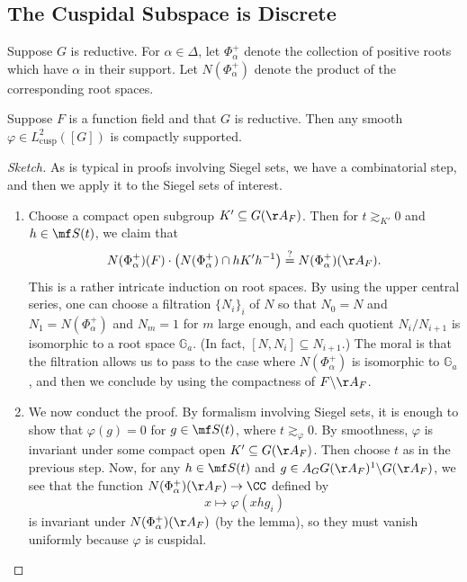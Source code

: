 \documentclass{article}
\begin{document}
\subsection{The Cuspidal Subspace is Discrete}
\begin{notation}
	Suppose $G$ is reductive. For $\alpha\in\Delta$, let $\Phi_\alpha^+$ denote the collection of positive roots which have $\alpha$ in their support. Let $N(\Phi_\alpha^+)$ denote the product of the corresponding root spaces.
\end{notation}
\begin{theorem}[Harder]
	Suppose $F$ is a function field and that $G$ is reductive. Then any smooth $\varphi\in L^2_{\mathrm{cusp}}([G])$ is compactly supported.
\end{theorem}
\begin{proof}[Sketch]
	As is typical in proofs involving Siegel sets, we have a combinatorial step, and then we apply it to the Siegel sets of interest.
	\begin{enumerate}
		\item Choose a compact open subgroup $K'\subseteq G(\AA_F)$. Then for $t\gtrsim_{K'}0$ and $h\in\mf S(t)$, we claim that
		\[N(\Phi_\alpha^+)(F)\cdot\left(N(\Phi_\alpha^+)\cap hK'h^{-1}\right)\stackrel?=N(\Phi_\alpha^+)(\AA_F).\]
		This is a rather intricate induction on root spaces. By using the upper central series, one can choose a filtration $\{N_i\}_i$ of $N$ so that $N_0=N$ and $N_1=N(\Phi_\alpha^+)$ and $N_m=1$ for $m$ large enough, and each quotient $N_i/N_{i+1}$ is isomorphic to a root space $\mathbb G_a$. (In fact, $[N,N_i]\subseteq N_{i+1}$.) The moral is that the filtration allows us to pass to the case where $N(\Phi_\alpha^+)$ is isomorphic to $\mathbb G_a$, and then we conclude by using the compactness of $F\backslash\AA_F$.
		\item We now conduct the proof. By formalism involving Siegel sets, it is enough to show that $\varphi(g)=0$ for $g\in\mf S(t)$, where $t\gtrsim_\varphi0$. By smoothness, $\varphi$ is invariant under some compact open $K'\subseteq G(\AA_F)$. Then choose $t$ as in the previous step. Now, for any $h\in\mf S(t)$ and $g\in A_GG(\AA_F)^1\backslash G(\AA_F)$, we see that the function $N(\Phi_\alpha^+)(\AA_F)\to\CC$ defined by
		\[x\mapsto\varphi(xhg_i)\]
		is invariant under $N(\Phi_\alpha^+)(\AA_F)$ (by the lemma), so they must vanish uniformly because $\varphi$ is cuspidal.
		\qedhere
	\end{enumerate}
\end{proof}
\end{document}
